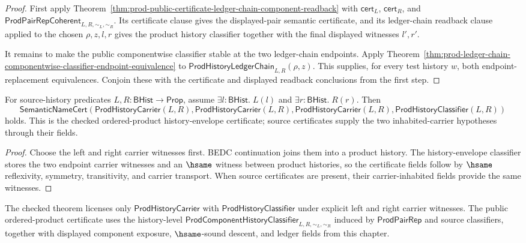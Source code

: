 \begin{proof}
First apply
Theorem~\ref{thm:prod-public-certificate-ledger-chain-component-readback} with
$\mathsf{cert}_L$, $\mathsf{cert}_R$, and
$\mathsf{ProdPairRepCoherent}_{L,R,\sim_L,\sim_R}$. Its certificate clause gives
the displayed-pair semantic certificate, and its ledger-chain readback clause
applied to the chosen $\rho,z,l,r$ gives the product history classifier together
with the final displayed witnesses $l',r'$.

It remains to make the public componentwise classifier stable at the two
ledger-chain endpoints. Apply
Theorem~\ref{thm:prod-ledger-chain-componentwise-classifier-endpoint-equivalence}
to $\mathsf{ProdHistoryLedgerChain}_{L,R}(\rho,z)$. This supplies, for every
test history $w$, both endpoint-replacement equivalences. Conjoin these with the
certificate and displayed readback conclusions from the first step.
\end{proof}

\begin{theorem}
\label{thm:concrete-prod-namecert}
For source-history predicates $L,R:\mathsf{BHist}\to\mathsf{Prop}$, assume
$\exists l:\mathsf{BHist}.\;L(l)$ and $\exists r:\mathsf{BHist}.\;R(r)$. Then
$$
\mathsf{SemanticNameCert}(\mathsf{ProdHistoryCarrier}(L,R),\mathsf{ProdHistoryCarrier}(L,R),\mathsf{ProdHistoryCarrier}(L,R),\mathsf{ProdHistoryClassifier}(L,R))
$$
holds. This is the checked ordered-product history-envelope certificate; source
certificates supply the two inhabited-carrier hypotheses through their fields.
\end{theorem}
\begin{proof}
Choose the left and right carrier witnesses first. BEDC continuation joins them
into a product history. The history-envelope classifier stores the two endpoint
carrier witnesses and an $\hsame$ witness between product histories, so the
certificate fields follow by $\hsame$ reflexivity, symmetry, transitivity, and
carrier transport. When source certificates are present, their carrier-inhabited
fields provide the same witnesses.
\end{proof}

\begin{corollary}
\label{cor:prod-history-envelope-licensed-not-primitive}
The checked theorem licenses only $\mathsf{ProdHistoryCarrier}$ with
$\mathsf{ProdHistoryClassifier}$ under explicit left and right carrier
witnesses. The public ordered-product certificate uses the history-level
$\mathsf{ProdComponentHistoryClassifier}_{L,R,\sim_L,\sim_R}$ induced by
$\mathsf{ProdPairRep}$ and source classifiers, together with displayed
component exposure, $\hsame$-sound descent, and ledger fields from this chapter.
\end{corollary}
